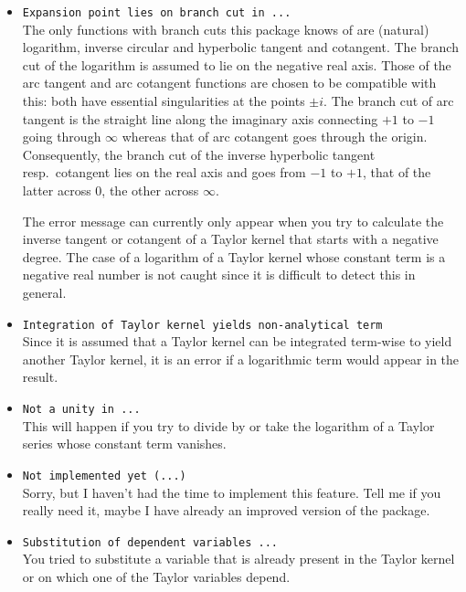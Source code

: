 \begin{itemize}
\item \verb|Expansion point lies on branch cut in ...|\\
    The only functions with branch cuts this package knows of are
    (natural) logarithm, inverse circular and hyperbolic tangent and
    cotangent.  The branch cut of the logarithm is assumed to lie on
    the negative real axis.  Those of the arc tangent and arc
    cotangent functions are chosen to be compatible with this: both
    have essential singularities at the points $\pm i$.  The branch
    cut of arc tangent is the straight line along the imaginary axis
    connecting $+1$ to $-1$ going through $\infty$ whereas that of arc
    cotangent goes through the origin.  Consequently, the branch cut
    of the inverse hyperbolic tangent resp.\ cotangent lies on the
    real axis and goes from $-1$ to $+1$, that of the latter across
    $0$, the other across $\infty$.
    
    The error message can currently only appear when you try to
    calculate the inverse tangent or cotangent of a Taylor
    kernel that starts with a negative degree.
    The case of a logarithm of a Taylor kernel whose constant term
    is a negative real number is not caught since it is
    difficult to detect this in general.

\item \verb|Integration of Taylor kernel yields non-analytical term|\\
    Since it is assumed that a Taylor kernel can be integrated term-wise
    to yield another Taylor kernel,
    it is an error if a logarithmic term would appear in the result.

\item \verb|Not a unity in ...|\\
    This will happen if you try to divide by or take the logarithm of 
    a Taylor series whose constant term vanishes.

\item \verb|Not implemented yet (...)|\\
    Sorry, but I haven't had the time to implement this feature.
    Tell me if you really need it, maybe I have already an improved
    version of the package.

\item \verb|Substitution of dependent variables ...|\\
    You tried to substitute a variable that is already present in the
    Taylor kernel or on which one of the Taylor variables depend.


\end{itemize}
